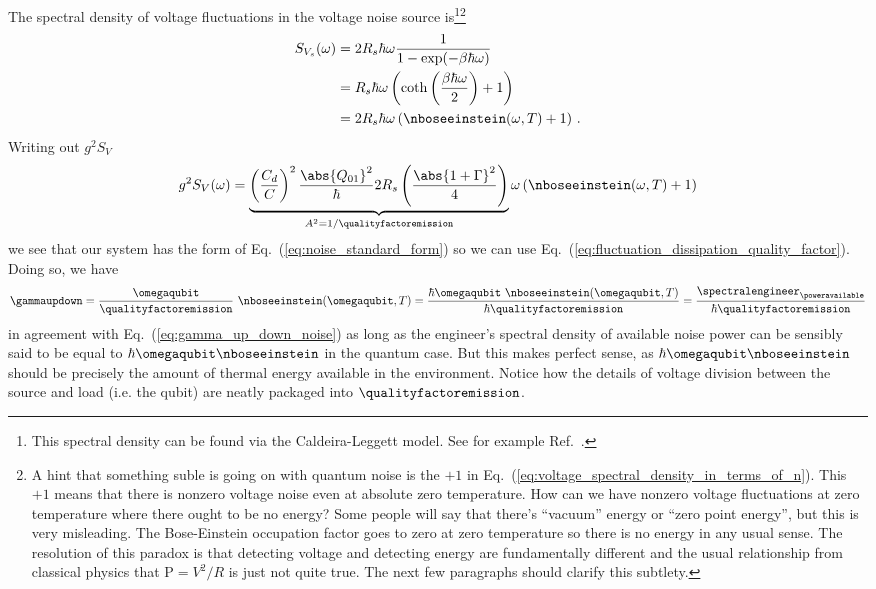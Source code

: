 The spectral density of voltage fluctuations in the voltage noise source is\footnote{This spectral density can be found via the Caldeira-Leggett model. See for example Ref.~\cite{Vool:2017:quantum_electromagnetics}.}\footnote{A hint that something suble is going on with quantum noise is the $+1$ in Eq.~(\ref{eq:voltage_spectral_density_in_terms_of_n}). This $+1$ means that there is nonzero voltage noise even at absolute zero temperature. How can we have nonzero voltage fluctuations at zero temperature where there ought to be no energy? Some people will say that there's ``vacuum'' energy or ``zero point energy'', but this is very misleading. The Bose-Einstein occupation factor goes to zero at zero temperature so there is no energy in any usual sense. The resolution of this paradox is that detecting voltage and detecting energy are fundamentally different and the usual relationship from classical physics that $\text{P} = V^2/R$ is just not quite true. The next few paragraphs should clarify this subtlety.}
\begin{align}
  S_{V_s}(\omega)
  &= 2 R_s \hbar \omega \frac{1}{1 - \exp(-\beta \hbar \omega)} \\
  &= R_s \hbar \omega \left( \coth \left(\frac{\beta \hbar \omega}{2} \right) + 1 \right) \\
  &= 2 R_s \hbar \omega \left( \nboseeinstein(\omega, T) + 1 \right)
  \, .
  \label{eq:voltage_spectral_density_in_terms_of_n}
\end{align}
Writing out $g^2 S_V$ 
\begin{equation}
  g^2 S_V(\omega) = \underbrace{\left( \frac{C_d}{C} \right)^2 \frac{\abs{Q_{01}}^2}{\hbar} 2 R_s \left( \frac{\abs{1 + \Gamma}^2}{4}\right)}_{A^2 = 1 / \qualityfactoremission} \omega \left( \nboseeinstein(\omega, T) + 1 \right) 
\end{equation}
we see that our system has the form of Eq.~(\ref{eq:noise_standard_form})
so we can use Eq.~(\ref{eq:fluctuation_dissipation_quality_factor}).
Doing so, we have
\begin{equation}
    \gammaupdown
    = \frac{\omegaqubit}{\qualityfactoremission} ~ \nboseeinstein(\omegaqubit, T)
    = \frac{\hbar \omegaqubit~ \nboseeinstein(\omegaqubit, T)}{\hbar \qualityfactoremission}
    = \frac{\spectralengineer_{\poweravailable}}{\hbar \qualityfactoremission}
\end{equation}
in agreement with Eq.~(\ref{eq:gamma_up_down_noise}) as long as the engineer's spectral density of available noise power can be sensibly said to be equal to $\hbar \omegaqubit \nboseeinstein$ in the quantum case.
But this makes perfect sense, as $\hbar \omegaqubit \nboseeinstein$ should be precisely the amount of thermal energy available in the environment.
Notice how the details of voltage division between the source and load (i.e. the qubit) are neatly packaged into $\qualityfactoremission$.


